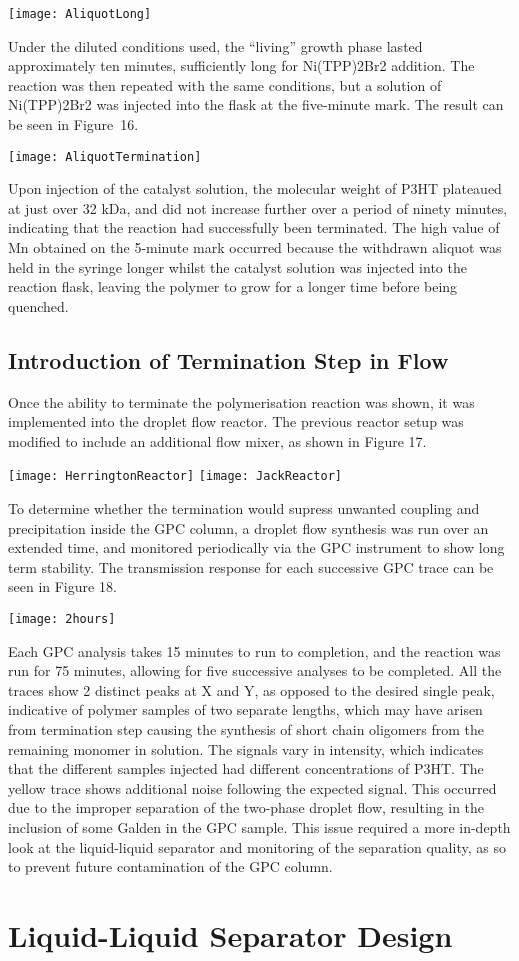 \texttt{[image: AliquotLong]}

Under the diluted conditions used, the “living” growth phase lasted approximately ten minutes, sufficiently long for Ni(TPP)2Br2 addition. The reaction was then repeated with the same conditions, but a solution of Ni(TPP)2Br2 was injected into the flask at the five-minute mark. The result can be seen in Figure 16.

\texttt{[image: AliquotTermination]}

Upon injection of the catalyst solution, the molecular weight of P3HT plateaued at just over 32 kDa, and did not increase further over a period of ninety minutes, indicating that the reaction had successfully been terminated. The high value of Mn obtained on the 5-minute mark occurred because the withdrawn aliquot was held in the syringe longer whilst the catalyst solution was injected into the reaction flask, leaving the polymer to grow for a longer time before being quenched.

\subsection{Introduction of Termination Step in Flow}

Once the ability to terminate the polymerisation reaction was shown, it was implemented into the droplet flow reactor. The previous reactor setup was modified to include an additional flow mixer, as shown in Figure 17.

\texttt{[image: HerringtonReactor]}
\texttt{[image: JackReactor]}

To determine whether the termination would supress unwanted coupling and precipitation inside the GPC column, a droplet flow synthesis was run over an extended time, and monitored periodically via the GPC instrument to show long term stability. The transmission response for each successive GPC trace can be seen in Figure 18.

\texttt{[image: 2hours]}

Each GPC analysis takes 15 minutes to run to completion, and the reaction was run for 75 minutes, allowing for five successive analyses to be completed. All the traces show 2 distinct peaks at X and Y, as opposed to the desired single peak, indicative of polymer samples of two separate lengths, which may have arisen from termination step causing the synthesis of short chain oligomers from the remaining monomer in solution. The signals vary in intensity, which indicates that the different samples injected had different concentrations of P3HT. The yellow trace shows additional noise following the expected signal. This occurred due to the improper separation of the two-phase droplet flow, resulting in the inclusion of some Galden in the GPC sample. This issue required a more in-depth look at the liquid-liquid separator and monitoring of the separation quality, as so to prevent future contamination of the GPC column.

\section{Liquid-Liquid Separator Design}

